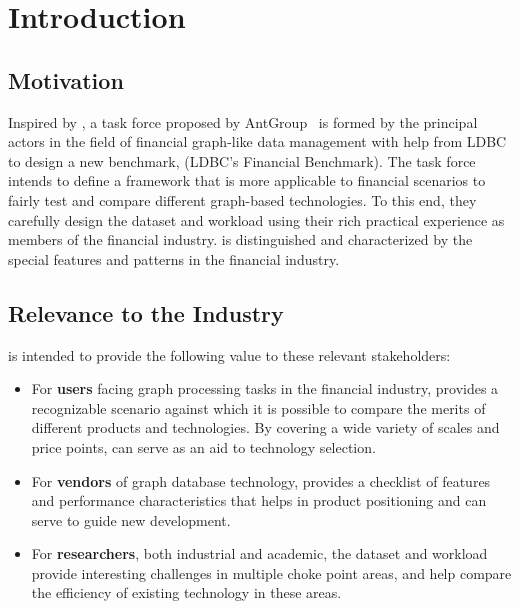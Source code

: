 \chapter{Introduction}
\label{sec:introduction}


\section{Motivation}

Inspired by \ldbcsnb, a task force proposed by AntGroup~\cite{antgroup} is
formed by the principal actors in the field of financial graph-like data
management with help from LDBC to design a new benchmark, \ldbcfinbench (LDBC's
Financial Benchmark). The task force intends to define a framework that is more
applicable to financial scenarios to fairly test and compare different graph-based
technologies. To this end, they carefully design the dataset and workload using
their rich practical experience as members of the financial industry. \ldbcfinbench
is distinguished and characterized by the special features and patterns in
the financial industry.


\section{Relevance to the Industry}

\ldbcfinbench is intended to provide the following value to these relevant
stakeholders:

\begin{itemize}
      \item For \textbf{users} facing graph processing tasks in the financial industry,
            \ldbcfinbench provides a recognizable scenario against which it is possible
            to compare the merits of different products and technologies. By covering 
            a wide variety of scales and price points, \ldbcfinbench can serve as an 
            aid to technology selection.
      \item For \textbf{vendors} of graph database technology, \ldbcfinbench provides a
            checklist of features and performance characteristics that helps in product
            positioning and can serve to guide new development.
      \item For \textbf{researchers}, both industrial and academic, the \ldbcfinbench
            dataset and workload provide interesting challenges in multiple choke point
            areas, and help compare the efficiency of existing technology in these
            areas.
\end{itemize}

